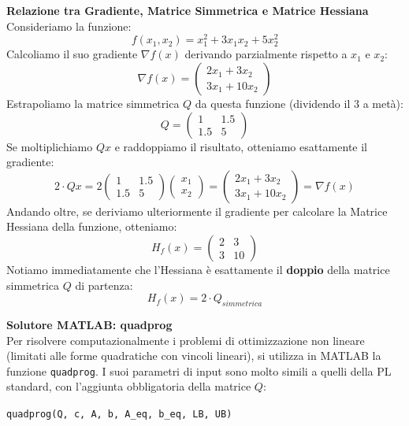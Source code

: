 \documentclass[12pt, a4paper]{article}
\newcommand{\separatore}{\noindent{\color{titlecolor!50}\rule{\textwidth}{0.6pt}}}
\begin{document}
	\vspace{0.4cm}
	\textbf{Relazione tra Gradiente, Matrice Simmetrica e Matrice Hessiana}\\
	Consideriamo la funzione:
	\[ f(x_1, x_2) = x_1^2 + 3x_1 x_2 + 5x_2^2 \]
	Calcoliamo il suo gradiente $\nabla f(x)$ derivando parzialmente rispetto a $x_1$ e $x_2$:
	\[
	\nabla f(x) = \begin{pmatrix} 2x_1 + 3x_2 \\ 3x_1 + 10x_2 \end{pmatrix}
	\]
	Estrapoliamo la matrice simmetrica $Q$ da questa funzione (dividendo il $3$ a metà):
	\[
	Q = \begin{pmatrix} 1 & 1.5 \\ 1.5 & 5 \end{pmatrix}
	\]
	Se moltiplichiamo $Qx$ e raddoppiamo il risultato, otteniamo esattamente il gradiente:
	\[
	2 \cdot Qx = 2 \begin{pmatrix} 1 & 1.5 \\ 1.5 & 5 \end{pmatrix} \begin{pmatrix} x_1 \\ x_2 \end{pmatrix} = \begin{pmatrix} 2x_1 + 3x_2 \\ 3x_1 + 10x_2 \end{pmatrix} = \nabla f(x)
	\]
	Andando oltre, se deriviamo ulteriormente il gradiente per calcolare la Matrice Hessiana della funzione, otteniamo:
	\[
	H_f(x) = \begin{pmatrix} 2 & 3 \\ 3 & 10 \end{pmatrix}
	\]
	Notiamo immediatamente che l'Hessiana è esattamente il \textbf{doppio} della matrice simmetrica $Q$ di partenza:
	\[ H_f(x) = 2 \cdot Q_{simmetrica} \]
	
	\vspace{0.6cm}
	\separatore
	\vspace{0.4cm}
	
	\textbf{Solutore MATLAB: quadprog}\\
	Per risolvere computazionalmente i problemi di ottimizzazione non lineare (limitati alle forme quadratiche con vincoli lineari), si utilizza in MATLAB la funzione \texttt{quadprog}. 
	I suoi parametri di input sono molto simili a quelli della PL standard, con l'aggiunta obbligatoria della matrice $Q$:
	\begin{center}
		\texttt{quadprog(Q, c, A, b, A\_eq, b\_eq, LB, UB)}
	\end{center}
	
\end{document}
